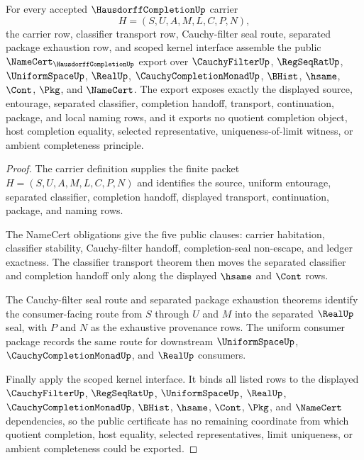 \begin{theorem}
\label{thm:hausdorff-completion-public-certificate}
For every accepted $\HausdorffCompletionUp$ carrier
$$
H=(S,U,A,M,L,C,P,N),
$$
the carrier row, classifier transport row, Cauchy-filter seal route, separated package exhaustion row, and scoped kernel interface assemble the public $\NameCert_{\HausdorffCompletionUp}$ export over $\CauchyFilterUp$, $\RegSeqRatUp$, $\UniformSpaceUp$, $\RealUp$, $\CauchyCompletionMonadUp$, $\BHist$, $\hsame$, $\Cont$, $\Pkg$, and $\NameCert$. The export exposes exactly the displayed source, entourage, separated classifier, completion handoff, transport, continuation, package, and local naming rows, and it exports no quotient completion object, host completion equality, selected representative, uniqueness-of-limit witness, or ambient completeness principle.
\end{theorem}
\begin{proof}
The carrier definition supplies the finite packet $H=(S,U,A,M,L,C,P,N)$ and identifies the source, uniform entourage, separated classifier, completion handoff, displayed transport, continuation, package, and naming rows.

The NameCert obligations give the five public clauses: carrier habitation, classifier stability, Cauchy-filter handoff, completion-seal non-escape, and ledger exactness. The classifier transport theorem then moves the separated classifier and completion handoff only along the displayed $\hsame$ and $\Cont$ rows.

The Cauchy-filter seal route and separated package exhaustion theorems identify the consumer-facing route from $S$ through $U$ and $M$ into the separated $\RealUp$ seal, with $P$ and $N$ as the exhaustive provenance rows. The uniform consumer package records the same route for downstream $\UniformSpaceUp$, $\CauchyCompletionMonadUp$, and $\RealUp$ consumers.

Finally apply the scoped kernel interface. It binds all listed rows to the displayed $\CauchyFilterUp$, $\RegSeqRatUp$, $\UniformSpaceUp$, $\RealUp$, $\CauchyCompletionMonadUp$, $\BHist$, $\hsame$, $\Cont$, $\Pkg$, and $\NameCert$ dependencies, so the public certificate has no remaining coordinate from which quotient completion, host equality, selected representatives, limit uniqueness, or ambient completeness could be exported.
\end{proof}

